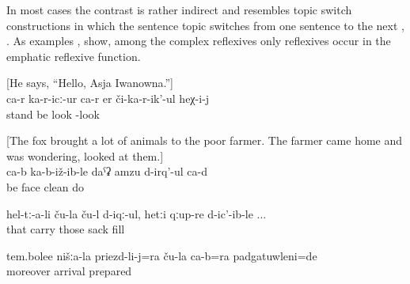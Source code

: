 In most cases the contrast is rather indirect and resembles topic switch constructions in which the sentence topic switches from one sentence to the next , . As examples ,  show, among the complex reflexives only  reflexives occur in the emphatic reflexive function. 
%
\begin{exe}
	\ex	\label{ex:He says, Hello, Asja Iwanowna@3b} [He says, ``Hello, Asja Iwanowna.'']\\
	\gll	ca-r	ka-r-icː-ur	ca-r	er či-ka-r-ik'-ul	heχ-i-j\\
			stand	be	look -look	\\
	\glt	{}

	\ex	\label{ex:‎‎Itself (the fox itself) is sitting and cleaning its face@3d} [The fox brought a lot of animals to the poor farmer. The farmer came home and was wondering, looked at them.]\\
	\gll	ca-b	ka-b-iž-ib-le	daˁʡ	amzu	d-irq'-ul	ca-d\\
			be	face	clean	do	\\
	\glt	{}

	\ex	\label{ex:They themselves were carrying the sacks and when they were filled@15a}
	\gll	hel-tː-a-li	ču-la	ču-l	d-iqː-ul,	hetːi	qːup-re	d-ic'-ib-le ...\\
		that			carry	those	sack	fill\\
	\glt	{}

	\ex	\label{ex:Moreover, (the Icari people) themselves were prepared for our coming@15b}
	\gll	tem.bolee	nišːa-la	priezd-li-j=ra	ču-la	ca-b=ra	padgatuwleni=de\\
		moreover		arrival			prepared\\
	\glt	{}
\end{exe}
	
